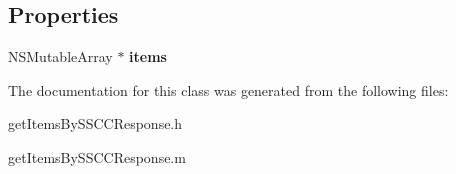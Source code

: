 \subsection*{Properties}
\begin{DoxyCompactItemize}
\item 
\hypertarget{interfaceget_items_by_s_s_c_c_response_a28bc83d629f9589cda7b1ff06f83e4db}{}N\+S\+Mutable\+Array $\ast$ {\bfseries items}\label{interfaceget_items_by_s_s_c_c_response_a28bc83d629f9589cda7b1ff06f83e4db}

\end{DoxyCompactItemize}


The documentation for this class was generated from the following files\+:\begin{DoxyCompactItemize}
\item 
get\+Items\+By\+S\+S\+C\+C\+Response.\+h\item 
get\+Items\+By\+S\+S\+C\+C\+Response.\+m\end{DoxyCompactItemize}
